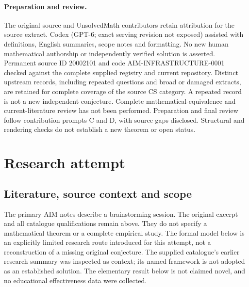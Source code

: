 \documentclass[11pt]{article}
\begin{document}
\paragraph{Preparation and review.}
The original source and UnsolvedMath contributors retain attribution for the source extract. Codex (GPT-6; exact serving revision not exposed) assisted with definitions, English summaries, scope notes and formatting. No new human mathematical authorship or independently verified solution is asserted. Permanent source ID 20002101 and code AIM-INFRASTRUCTURE-0001 checked against the complete supplied registry and current repository. Distinct upstream records, including repeated questions and broad or damaged extracts, are retained for complete coverage of the source CS category. A repeated record is not a new independent conjecture. Complete mathematical-equivalence and current-literature review has not been performed. Preparation and final review follow contribution prompts C and D, with source gaps disclosed. Structural and rendering checks do not establish a new theorem or open status.
\label{end:20002101}

\section{Research attempt}
\subsection{Literature, source context and scope}
The primary AIM notes describe a brainstorming session. The original excerpt and all catalogue qualifications remain above. They do not specify a mathematical theorem or a complete empirical study. The formal model below is an explicitly limited research route introduced for this attempt, not a reconstruction of a missing original conjecture. The supplied catalogue's earlier research summary was inspected as context; its named framework is not adopted as an established solution. The elementary result below is not claimed novel, and no educational effectiveness data were collected.
\end{document}
